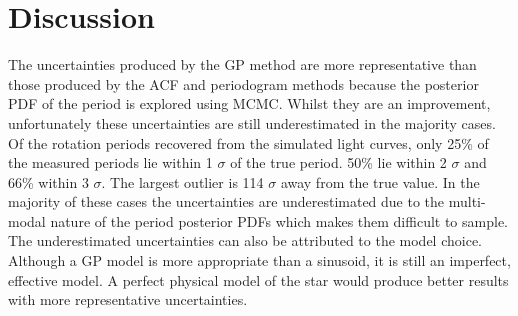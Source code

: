 \documentclass[useAMS, usenatbib, preprint, 12pt]{aastex}
\begin{document}
\section{Discussion}
\label{sec:discussion}

The uncertainties produced by the GP method are more representative than those
produced by the ACF and periodogram methods because the posterior PDF of the
period is explored using MCMC.
Whilst they are an improvement, unfortunately these uncertainties are still
underestimated in the majority cases.
Of the rotation periods recovered from the simulated light curves, only 25\%
of the measured periods lie within 1 $\sigma$ of the true period.
50\% lie within 2 $\sigma$ and 66\% within 3 $\sigma$.
The largest outlier is 114 $\sigma$ away from the true value.
In the majority of these cases the uncertainties are underestimated due to the
multi-modal nature of the period posterior PDFs which makes them difficult to
sample.
The underestimated uncertainties can also be attributed to the model choice.
Although a GP model is more appropriate than a sinusoid, it is still an
imperfect, effective model.
A perfect physical model of the star would produce better results with more
representative uncertainties.
\end{document}
